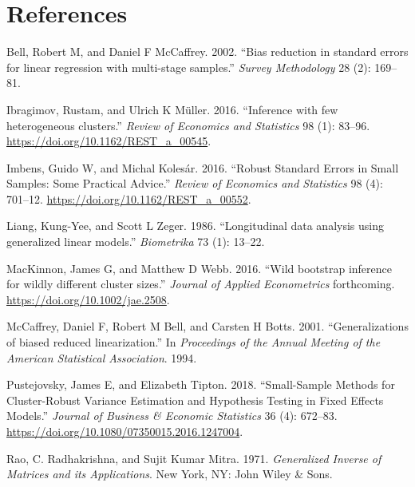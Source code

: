 \documentclass[12pt]{article}
\newlength{\cslhangindent}
\newlength{\cslentryspacingunit} %
\newenvironment{CSLReferences}[2] %
 {%
  \setlength{\parindent}{0pt}
  \ifodd #1
  \let\oldpar\par
  \def\par{\hangindent=\cslhangindent\oldpar}
  \fi
  \setlength{\parskip}{#2\cslentryspacingunit}
 }%
 {}
\begin{document}
\hypertarget{references}{%
\section*{References}\label{references}}

\hypertarget{refs}{}
\begin{CSLReferences}{1}{0}
\leavevmode{}%
Bell, Robert M, and Daniel F McCaffrey. 2002. {``{Bias reduction in
standard errors for linear regression with multi-stage samples}.''}
\emph{Survey Methodology} 28 (2): 169--81.

\leavevmode{}%
Ibragimov, Rustam, and Ulrich K Müller. 2016. {``{Inference with few
heterogeneous clusters}.''} \emph{Review of Economics and Statistics} 98
(1): 83--96. \url{https://doi.org/10.1162/REST_a_00545}.

\leavevmode{}%
Imbens, Guido W, and Michal Kolesár. 2016. {``Robust Standard Errors in
Small Samples: Some Practical Advice.''} \emph{Review of Economics and
Statistics} 98 (4): 701--12. \url{https://doi.org/10.1162/REST_a_00552}.

\leavevmode{}%
Liang, Kung-Yee, and Scott L Zeger. 1986. {``{Longitudinal data analysis
using generalized linear models}.''} \emph{Biometrika} 73 (1): 13--22.

\leavevmode{}%
MacKinnon, James G, and Matthew D Webb. 2016. {``{Wild bootstrap
inference for wildly different cluster sizes}.''} \emph{Journal of
Applied Econometrics} forthcoming.
\url{https://doi.org/10.1002/jae.2508}.

\leavevmode{}%
McCaffrey, Daniel F, Robert M Bell, and Carsten H Botts. 2001.
{``{Generalizations of biased reduced linearization}.''} In
\emph{Proceedings of the Annual Meeting of the American Statistical
Association}. 1994.

\leavevmode{}%
Pustejovsky, James E, and Elizabeth Tipton. 2018. {``Small-Sample
Methods for Cluster-Robust Variance Estimation and Hypothesis Testing in
Fixed Effects Models.''} \emph{Journal of Business \& Economic
Statistics} 36 (4): 672--83.
\url{https://doi.org/10.1080/07350015.2016.1247004}.

\leavevmode{}%
Rao, C. Radhakrishna, and Sujit Kumar Mitra. 1971. \emph{{Generalized
Inverse of Matrices and its Applications}}. New York, NY: John Wiley \&
Sons.


\end{CSLReferences}
\end{document}
